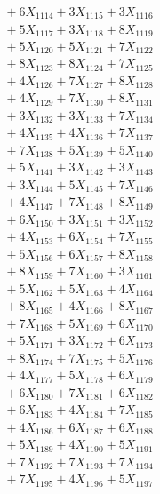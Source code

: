 \documentclass[a4paper,10pt]{article}
\begin{document}
{\begin{align}
&\;  + 6 X_{1114} + 3 X_{1115} + 3 X_{1116} \\[0.3ex]
&\;  + 5 X_{1117} + 3 X_{1118} + 8 X_{1119} \\[0.5ex]\allowbreak
&\;  + 5 X_{1120} + 5 X_{1121} + 7 X_{1122} \\[0.3ex]
&\;  + 8 X_{1123} + 8 X_{1124} + 7 X_{1125} \\[0.3ex]
&\;  + 4 X_{1126} + 7 X_{1127} + 8 X_{1128} \\[0.3ex]
&\;  + 4 X_{1129} + 7 X_{1130} + 8 X_{1131} \\[0.3ex]
&\;  + 3 X_{1132} + 3 X_{1133} + 7 X_{1134} \\[0.3ex]
&\;  + 4 X_{1135} + 4 X_{1136} + 7 X_{1137} \\[0.3ex]
&\;  + 7 X_{1138} + 5 X_{1139} + 5 X_{1140} \\[0.3ex]
&\;  + 5 X_{1141} + 3 X_{1142} + 3 X_{1143} \\[0.3ex]
&\;  + 3 X_{1144} + 5 X_{1145} + 7 X_{1146} \\[0.3ex]
&\;  + 4 X_{1147} + 7 X_{1148} + 8 X_{1149} \\[0.5ex]\allowbreak
&\;  + 6 X_{1150} + 3 X_{1151} + 3 X_{1152} \\[0.3ex]
&\;  + 4 X_{1153} + 6 X_{1154} + 7 X_{1155} \\[0.3ex]
&\;  + 5 X_{1156} + 6 X_{1157} + 8 X_{1158} \\[0.3ex]
&\;  + 8 X_{1159} + 7 X_{1160} + 3 X_{1161} \\[0.3ex]
&\;  + 5 X_{1162} + 5 X_{1163} + 4 X_{1164} \\[0.3ex]
&\;  + 8 X_{1165} + 4 X_{1166} + 8 X_{1167} \\[0.3ex]
&\;  + 7 X_{1168} + 5 X_{1169} + 6 X_{1170} \\[0.3ex]
&\;  + 5 X_{1171} + 3 X_{1172} + 6 X_{1173} \\[0.3ex]
&\;  + 8 X_{1174} + 7 X_{1175} + 5 X_{1176} \\[0.3ex]
&\;  + 4 X_{1177} + 5 X_{1178} + 6 X_{1179} \\[0.5ex]\allowbreak
&\;  + 6 X_{1180} + 7 X_{1181} + 6 X_{1182} \\[0.3ex]
&\;  + 6 X_{1183} + 4 X_{1184} + 7 X_{1185} \\[0.3ex]
&\;  + 4 X_{1186} + 6 X_{1187} + 6 X_{1188} \\[0.3ex]
&\;  + 5 X_{1189} + 4 X_{1190} + 5 X_{1191} \\[0.3ex]
&\;  + 7 X_{1192} + 7 X_{1193} + 7 X_{1194} \\[0.3ex]
&\;  + 7 X_{1195} + 4 X_{1196} + 5 X_{1197} \\[0.3ex]

\end{align}}
\end{document}
